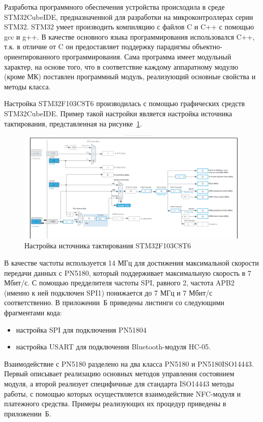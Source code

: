 Разработка программного обеспечения устройства происходила в среде STM32CubeIDE, предназначенной для разработки на микроконтроллерах серии STM32.
STM32 умеет производить компиляцию с файлов C и C++ с помощью gcc и g++.
В качестве основного языка программирования использовался C++, т.к. в отличие от C он предоставляет поддержку парадигмы объектно-ориентированного программирования.
Сама программа имеет модульный характер, на основе того, что в соответствие каждому аппаратному модулю (кроме МК) поставлен программный модуль, реализующий основные свойства и методы класса.

Настройка STM32F103C8T6 производилась с помощью графических средств STM32CubeIDE.
Пример такой настройки является настройка источника тактирования, представленная на рисунке~\ref{fig:stm_cube}.

\begin{figure}[H]
    \centering
    \includegraphics[width=1\textwidth]{images/design/stm_cube}
    \caption{\centering Настройка источника тактирования STM32F103C8T6}
    \label{fig:stm_cube}
\end{figure}

В качестве частоты используется 14 МГц для достижения максимальной скорости передачи данных с PN5180, который поддерживает максимальную скорость в 7 Мбит/с.
С помощью предделителя частоты SPI, равного 2, частота APB2 (именно к ней подключен SPI1) понижается до 7 МГц и 7 Мбит/с соответственно.
В приложении~Б приведены листинги со следующими фрагментами кода:
\begin{itemize}
    \item настройка SPI для подключения PN51804
    \item настройка USART для подключения Bluetooth-модуля HC-05.
\end{itemize}

Взаимодействие с PN5180 разделено на два класса PN5180 и PN5180ISO14443.
Первый описывает реализацию основных методов управления состоянием модуля, а второй реализует специфичные для стандарта ISO14443 методы работы, с помощью которых осуществляется взаимодействие NFC-модуля и платежного средства.
Примеры реализующих их процедур приведены в приложении~Б.



